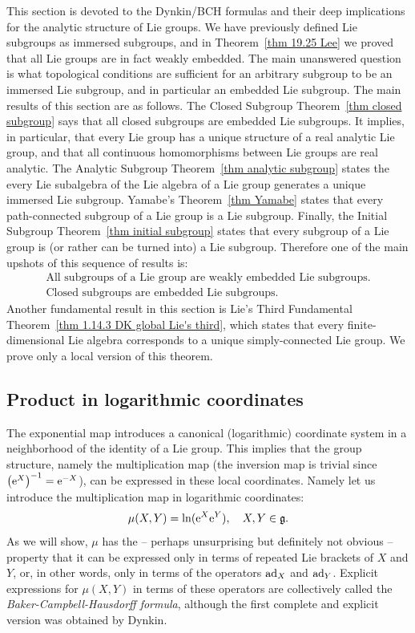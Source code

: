 This section is devoted to the Dynkin/BCH formulas and their deep implications for the analytic structure of Lie groups. We have previously defined Lie subgroups as immersed subgroups, and in Theorem~\ref{thm 19.25 Lee} we proved that all Lie groups are in fact weakly embedded. The main unanswered question is what topological conditions are sufficient for an arbitrary subgroup to be an immersed Lie subgroup, and in particular an embedded Lie subgroup. The main results of this section are as follows. The Closed Subgroup Theorem~\ref{thm closed subgroup} says that all closed subgroups are embedded Lie subgroups. It implies, in particular, that every Lie group has a unique structure of a real analytic Lie group, and that all continuous homomorphisms between Lie groups are real analytic. The Analytic Subgroup Theorem~\ref{thm analytic subgroup} states the every Lie subalgebra of the Lie algebra of a Lie group generates a unique immersed Lie subgroup. Yamabe's Theorem~\ref{thm Yamabe} states that every path-connected subgroup of a Lie group is a Lie subgroup.  Finally, the Initial Subgroup Theorem~\ref{thm initial subgroup} states that every subgroup of a Lie group is (or rather can be turned into) a Lie subgroup. Therefore one of the main upshots of this sequence of results is:
\begin{gather}
    \text{All subgroups of a Lie group are weakly embedded Lie subgroups.}\\
    \text{Closed subgroups are embedded Lie subgroups.}
\end{gather}
Another fundamental result in this section is Lie's Third Fundamental Theorem~\ref{thm 1.14.3 DK global Lie's third}, which states that every finite-dimensional Lie algebra corresponds to a unique simply-connected Lie group. We prove only a local version of this theorem.

\subsection{Product in logarithmic coordinates}\label{sec: product in log coordinates}

The exponential map introduces a canonical (logarithmic) coordinate system in a neighborhood of the identity of a Lie group. This implies that the group structure, namely the multiplication map (the inversion map is trivial since $\left(\mathrm{e}^X\right)^{-1}=\mathrm{e}^{-X}$), can be expressed in these local coordinates. Namely let us introduce the multiplication map in logarithmic coordinates:
\[\mu(X,Y)=\ln(\mathrm{e}^X\mathrm{e}^Y),\quad X,Y\in\mathfrak{g}.\]
As we will show, $\mu$ has the -- perhaps unsurprising but definitely not obvious -- property that it can be expressed only in terms of repeated Lie brackets of $X$ and $Y$, or, in other words, only in terms of the operators $\mathrm{ad}_X$ and $\mathrm{ad}_Y$. Explicit expressions for $\mu(X,Y)$ in terms of these operators are collectively called the \emph{Baker-Campbell-Hausdorff formula}, although the first complete and explicit version was obtained by Dynkin.

